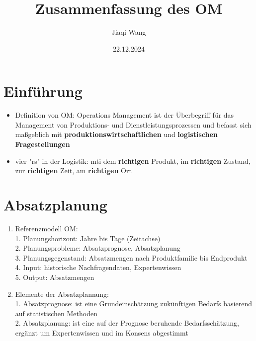 \documentclass[12pt, letterpaper]{article}
\begin{document}
\begin{CJK*}{UTF8}{gbsn}%

\title{Zusammenfassung des OM}
\author{Jiaqi Wang} %
\date{22.12.2024} %
\maketitle %

\vspace{5cm}

\section{Einführung} %
\begin{itemize}
\item Definition von OM: Operations Management ist der Überbegriff für das Management von Produktions- und Dienstleistungsprozessen und
befasst sich maßgeblich mit \textbf{produktionswirtschaftlichen} und \textbf{logistischen Fragestellungen}

\item vier "rs" in der Logistik: mti dem \textbf{richtigen} Produkt, im \textbf{richtigen} Zustand, zur \textbf{richtigen} Zeit, am \textbf{richtigen} Ort

\end{itemize}


\newpage
{}%

\section{Absatzplanung}

\begin{enumerate}
\item Referenzmodell OM:\\
1. Planungshorizont: Jahre bis Tage (Zeitachse)\\
2. Planungsprobleme: Absatzprognose, Absatzplanung\\
3. Planungsgegenstand: Absatzmengen nach Produktfamilie bis Endprodukt\\
4. Input: historische Nachfragendaten, Expertenwissen\\
5. Output: Absatzmengen

\item Elemente der Absatzplannung:\\
1. Absatzprognose: ist eine Grundeinschätzung zukünftigen Bedarfs basierend
auf statistischen Methoden\\
2. Absatzplanung: ist eine auf der Prognose beruhende Bedarfsschätzung,
ergänzt um Expertenwissen und im Konsens abgestimmt\\


\end{enumerate}
\end{CJK*}
\end{document}
